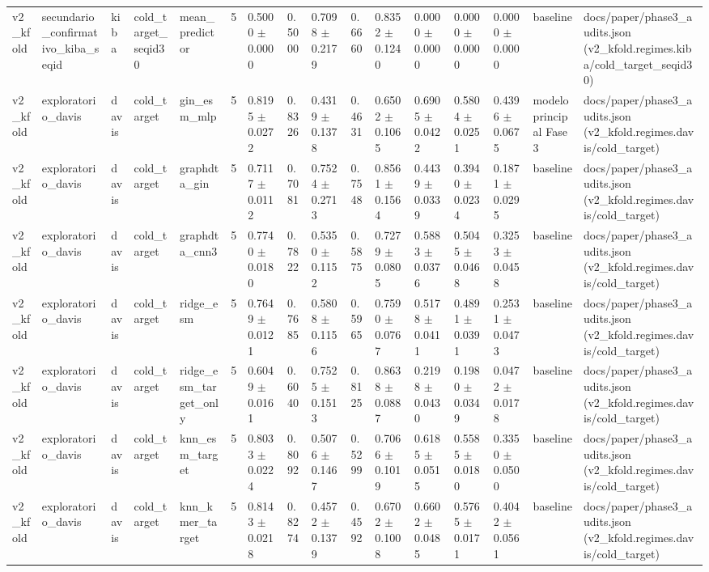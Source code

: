 \begin{table}[htbp]
\begin{tabular}{llllllllllllllll}
v2\_kfold & secundario\_confirmativo\_kiba\_seqid & kiba & cold\_target\_seqid30 & mean\_predictor & 5 & 0.5000 $\pm$ 0.0000 & 0.5000 & 0.7098 $\pm$ 0.2179 & 0.6660 & 0.8352 $\pm$ 0.1240 & 0.0000 $\pm$ 0.0000 & 0.0000 $\pm$ 0.0000 & 0.0000 $\pm$ 0.0000 & baseline & docs/paper/phase3\_audits.json (v2\_kfold.regimes.kiba/cold\_target\_seqid30) \\
v2\_kfold & exploratorio\_davis & davis & cold\_target & gin\_esm\_mlp & 5 & 0.8195 $\pm$ 0.0272 & 0.8326 & 0.4319 $\pm$ 0.1378 & 0.4631 & 0.6502 $\pm$ 0.1065 & 0.6905 $\pm$ 0.0422 & 0.5804 $\pm$ 0.0251 & 0.4396 $\pm$ 0.0675 & modelo principal Fase 3 & docs/paper/phase3\_audits.json (v2\_kfold.regimes.davis/cold\_target) \\
v2\_kfold & exploratorio\_davis & davis & cold\_target & graphdta\_gin & 5 & 0.7117 $\pm$ 0.0112 & 0.7081 & 0.7524 $\pm$ 0.2713 & 0.7548 & 0.8561 $\pm$ 0.1564 & 0.4439 $\pm$ 0.0339 & 0.3940 $\pm$ 0.0234 & 0.1871 $\pm$ 0.0295 & baseline & docs/paper/phase3\_audits.json (v2\_kfold.regimes.davis/cold\_target) \\
v2\_kfold & exploratorio\_davis & davis & cold\_target & graphdta\_cnn3 & 5 & 0.7740 $\pm$ 0.0180 & 0.7822 & 0.5350 $\pm$ 0.1152 & 0.5875 & 0.7279 $\pm$ 0.0805 & 0.5883 $\pm$ 0.0376 & 0.5045 $\pm$ 0.0468 & 0.3253 $\pm$ 0.0458 & baseline & docs/paper/phase3\_audits.json (v2\_kfold.regimes.davis/cold\_target) \\
v2\_kfold & exploratorio\_davis & davis & cold\_target & ridge\_esm & 5 & 0.7649 $\pm$ 0.0121 & 0.7685 & 0.5808 $\pm$ 0.1156 & 0.5965 & 0.7590 $\pm$ 0.0767 & 0.5178 $\pm$ 0.0411 & 0.4891 $\pm$ 0.0391 & 0.2531 $\pm$ 0.0473 & baseline & docs/paper/phase3\_audits.json (v2\_kfold.regimes.davis/cold\_target) \\
v2\_kfold & exploratorio\_davis & davis & cold\_target & ridge\_esm\_target\_only & 5 & 0.6049 $\pm$ 0.0161 & 0.6040 & 0.7525 $\pm$ 0.1513 & 0.8125 & 0.8638 $\pm$ 0.0887 & 0.2198 $\pm$ 0.0430 & 0.1980 $\pm$ 0.0349 & 0.0472 $\pm$ 0.0178 & baseline & docs/paper/phase3\_audits.json (v2\_kfold.regimes.davis/cold\_target) \\
v2\_kfold & exploratorio\_davis & davis & cold\_target & knn\_esm\_target & 5 & 0.8033 $\pm$ 0.0224 & 0.8092 & 0.5076 $\pm$ 0.1467 & 0.5299 & 0.7066 $\pm$ 0.1019 & 0.6185 $\pm$ 0.0515 & 0.5585 $\pm$ 0.0180 & 0.3350 $\pm$ 0.0500 & baseline & docs/paper/phase3\_audits.json (v2\_kfold.regimes.davis/cold\_target) \\
v2\_kfold & exploratorio\_davis & davis & cold\_target & knn\_kmer\_target & 5 & 0.8143 $\pm$ 0.0218 & 0.8274 & 0.4572 $\pm$ 0.1379 & 0.4592 & 0.6702 $\pm$ 0.1008 & 0.6602 $\pm$ 0.0485 & 0.5765 $\pm$ 0.0171 & 0.4042 $\pm$ 0.0561 & baseline & docs/paper/phase3\_audits.json (v2\_kfold.regimes.davis/cold\_target) \\

\end{tabular}
\end{table}
